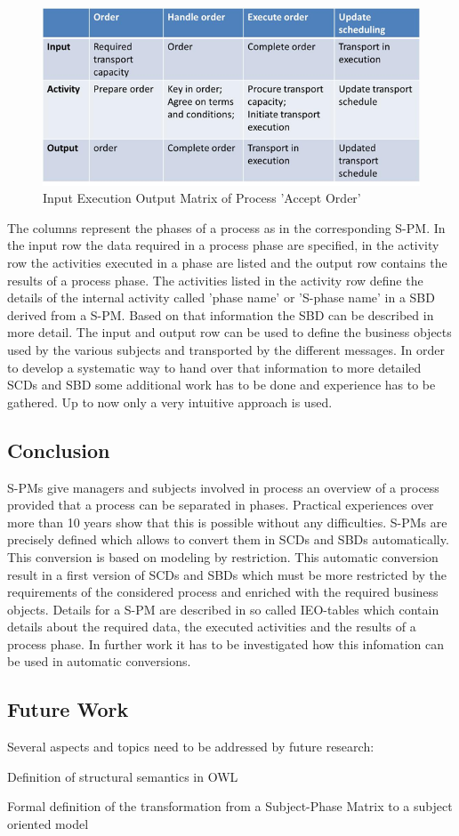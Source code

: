 \begin{figure}[hbtp]
	\includegraphics[scale=0.5]{Figures/Chapter5/Subject-Phase/Inpurt-Execution-Output.png}
	\caption{Input Execution Output Matrix of Process 'Accept Order'}
	\label{fig:Inpurt-Execution-Output}
\end{figure}

The columns represent the phases of a process as in the corresponding  S-PM. In the input row the data required in a process phase are specified, in the activity row the activities executed in a phase are listed and the output row contains the results of a process phase. 
The activities listed in the activity row define the details of the internal activity called 'phase name' or 'S-phase name' in a SBD derived from a S-PM. Based on that information the SBD can be described in more detail.
The input and output row can be used to define the business objects used by the various subjects and transported by the different messages.
In order to develop a systematic way to hand over that information to more detailed SCDs and SBD some additional work has to be done and experience has to be gathered. Up to now only a very intuitive approach is used.

\subsection{Conclusion}
S-PMs give managers and subjects involved in process an overview of a process provided that a process can be separated in phases. Practical experiences over more than 10 years show that this is possible without any difficulties. S-PMs are precisely defined which allows to convert them in SCDs and SBDs automatically. This conversion is based on modeling by restriction. This automatic conversion result in a first version of SCDs and SBDs which must be more restricted by the requirements of the considered process and enriched with the required business objects. Details for a S-PM are described in so called IEO-tables which contain details about the required data, the executed activities and the results of a process phase. In further work it has to be investigated how this infomation can be used in automatic conversions.

\subsection{Future Work}
Several aspects and topics need to be addressed by future research:
\begin{list}{-}{spacing}
	\item Definition of structural semantics in OWL
	\item Formal definition of the transformation from a Subject-Phase Matrix to a subject oriented model
\end{list}